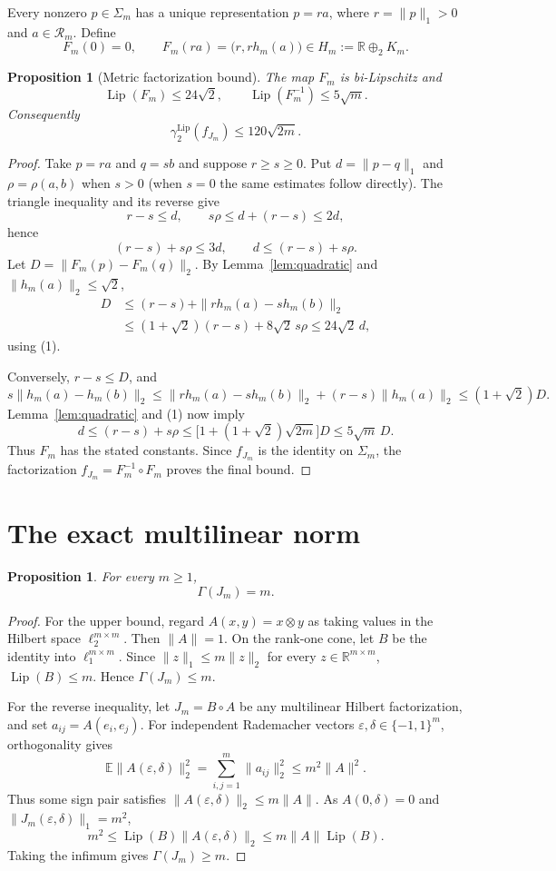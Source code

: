 \documentclass[11pt]{article}
\newtheorem{proposition}[theorem]{Proposition}
\newcommand{\Lip}{\operatorname{Lip}}
\newcommand{\R}{\mathbb R}
\newcommand{\G}{\Gamma}
\newcommand{\gLip}{\gamma^{\mathrm{Lip}}_2}
\newcommand{\Sig}{\Sigma}
\begin{document}
Every nonzero $p\in\Sig_m$ has a unique representation
$p=r a$, where $r=\|p\|_1>0$ and $a\in\mathcal R_m$.  Define
\[
 F_m(0)=0,
 \qquad
 F_m(ra)=\bigl(r,rh_m(a)\bigr)\in H_m:=\R\oplus_2 K_m.
\]

\begin{proposition}[Metric factorization bound]\label{prop:metric}
The map $F_m$ is bi-Lipschitz and
\[
 \Lip(F_m)\leq24\sqrt2,
 \qquad
 \Lip(F_m^{-1})\leq5\sqrt m.
\]
Consequently
\[
 \gLip(f_{J_m})\leq120\sqrt{2m}.
\]
\end{proposition}

\begin{proof}
Take $p=ra$ and $q=sb$ and suppose $r\geq s\geq0$.  Put
$d=\|p-q\|_1$ and $\rho=\rho(a,b)$ when $s>0$ (when $s=0$ the same
estimates follow directly).  The triangle inequality and its reverse give
\[
 r-s\leq d,
 \qquad
 s\rho\leq d+(r-s)\leq2d,
\]
hence
\[
 (r-s)+s\rho\leq3d,
 \qquad
 d\leq(r-s)+s\rho.                                      \tag{1}
\]
Let $D=\|F_m(p)-F_m(q)\|_2$.  By
Lemma~\ref{lem:quadratic} and $\|h_m(a)\|_2\leq\sqrt2$,
\begin{align*}
 D
 &\leq (r-s)+\|rh_m(a)-sh_m(b)\|_2\\
 &\leq(1+\sqrt2)(r-s)+8\sqrt2\,s\rho
 \leq24\sqrt2\,d,
\end{align*}
using (1).

Conversely, $r-s\leq D$, and
\[
 s\|h_m(a)-h_m(b)\|_2
 \leq\|rh_m(a)-sh_m(b)\|_2+(r-s)\|h_m(a)\|_2
 \leq(1+\sqrt2)D.
\]
Lemma~\ref{lem:quadratic} and (1) now imply
\[
 d\leq(r-s)+s\rho
 \leq\bigl[1+(1+\sqrt2)\sqrt{2m}\bigr]D
 \leq5\sqrt m\,D.
\]
Thus $F_m$ has the stated constants.  Since $f_{J_m}$ is the identity on
$\Sig_m$, the factorization $f_{J_m}=F_m^{-1}\circ F_m$ proves the final
bound.
\end{proof}

\section{The exact multilinear norm}

\begin{proposition}\label{prop:gamma}
For every $m\geq1$,
\[
 \G(J_m)=m.
\]
\end{proposition}

\begin{proof}
For the upper bound, regard
$A(x,y)=x\otimes y$ as taking values in the Hilbert space
$\ell_2^{m\times m}$.  Then $\|A\|=1$.  On the rank-one cone, let $B$ be
the identity into $\ell_1^{m\times m}$.  Since
$\|z\|_1\leq m\|z\|_2$ for every $z\in\R^{m\times m}$,
$\Lip(B)\leq m$.  Hence $\G(J_m)\leq m$.

For the reverse inequality, let $J_m=B\circ A$ be any multilinear Hilbert
factorization, and set $a_{ij}=A(e_i,e_j)$.  For independent Rademacher
vectors $\varepsilon,\delta\in\{-1,1\}^m$, orthogonality gives
\[
 \mathbb E\|A(\varepsilon,\delta)\|_2^2
 =\sum_{i,j=1}^m\|a_{ij}\|_2^2
 \leq m^2\|A\|^2.
\]
Thus some sign pair satisfies
$\|A(\varepsilon,\delta)\|_2\leq m\|A\|$.  As
$A(0,\delta)=0$ and
$\|J_m(\varepsilon,\delta)\|_1=m^2$,
\[
 m^2
 \leq\Lip(B)\|A(\varepsilon,\delta)\|_2
 \leq m\|A\|\Lip(B).
\]
Taking the infimum gives $\G(J_m)\geq m$.
\end{proof}
\end{document}
